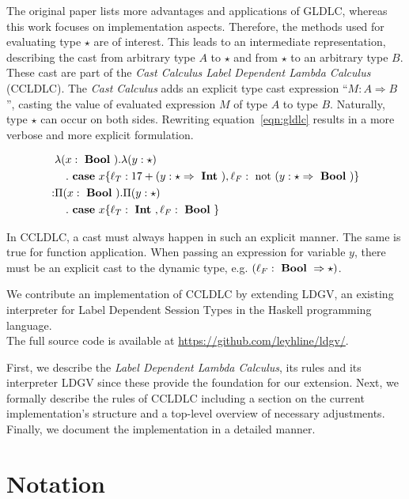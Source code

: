 The original paper lists more advantages and applications of GLDLC, whereas this work focuses on implementation aspects. Therefore, the methods used for evaluating type $\star$ are of interest. This leads to an intermediate representation, describing the cast from arbitrary type $A$ to $\star$ and from $\star$ to an arbitrary type $B$. These cast are part of the \emph{Cast Calculus Label Dependent Lambda Calculus} (CCLDLC). The \emph{Cast Calculus} adds an explicit type cast expression ``$M : A \Rightarrow B$'', casting the value of evaluated expression $M$ of type $A$ to type $B$. Naturally, type $\star$ can occur on both sides. Rewriting equation~\ref{eqn:gldlc} results in a more verbose and more explicit formulation.

\begin{equation}\label{eqn:ccldlc}
\begin{split}
&\lambda (x: \text{ \textbf{Bool} }) . \lambda (y: \star ) \\
&\quad . \text{ \textbf{case} } x \{\ell_T: 17+(y:\star \Rightarrow \text{ \textbf{Int} }),\ell_F: \text{ not } (y:\star \Rightarrow \text{ \textbf{Bool} })\} \\
: & \Pi(x : \text{ \textbf{Bool} }) . \Pi (y: \star ) \\
&\quad . \text{ \textbf{case} } x \{\ell_T: \text{ \textbf{Int} }, \ell_F: \text{ \textbf{Bool} } \}
\end{split}
\end{equation}

In CCLDLC, a cast must always happen in such an explicit manner. The same is true for function application. When passing an expression for variable $y$, there must be an explicit cast to the dynamic type, e.g. $(\ell_F : \text{ \textbf{Bool} } \Rightarrow \star)$.

We contribute an implementation of CCLDLC by extending LDGV, an existing interpreter for Label Dependent Session Types in the Haskell programming language.
\\
The full source code is available at \url{https://github.com/leyhline/ldgv/}.

First, we describe the \emph{Label Dependent Lambda Calculus}, its rules and its interpreter LDGV since these provide the foundation for our extension. Next, we formally describe the rules of CCLDLC including a section on the current implementation's structure and a top-level overview of necessary adjustments. Finally, we document the implementation in a detailed manner.

\section{Notation}

